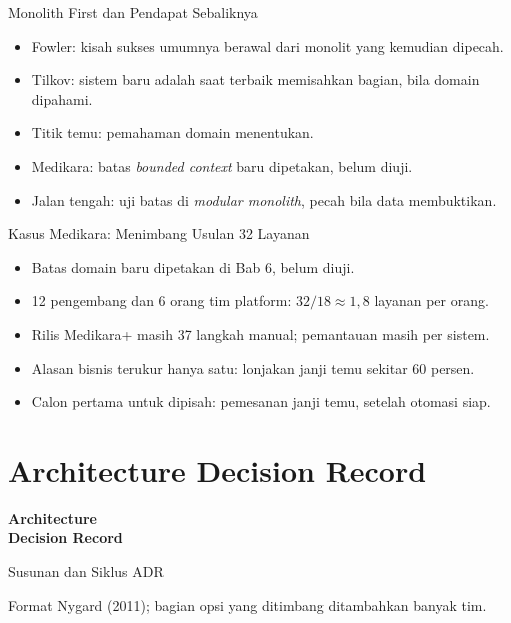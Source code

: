 \documentclass[aspectratio=169, table, 12pt]{beamer}
\begin{document}
\begin{frame}{{\Large Monolith First dan Pendapat Sebaliknya}}
  \vspace{10pt}
  \begin{itemize}
    \item Fowler: kisah sukses umumnya berawal dari monolit yang kemudian dipecah.
    \item Tilkov: sistem baru adalah saat terbaik memisahkan bagian, bila domain dipahami.
    \item Titik temu: pemahaman domain menentukan.
    \item Medikara: batas \textit{bounded context} baru dipetakan, belum diuji.
    \item Jalan tengah: uji batas di \textit{modular monolith}, pecah bila data membuktikan.
  \end{itemize}
\end{frame}

\begin{frame}{{\Large Kasus Medikara: Menimbang Usulan 32 Layanan}}
  \vspace{10pt}
  \begin{itemize}
    \item Batas domain baru dipetakan di Bab 6, belum diuji.
    \item 12 pengembang dan 6 orang tim platform: $32/18 \approx 1{,}8$ layanan per orang.
    \item Rilis Medikara+ masih 37 langkah manual; pemantauan masih per sistem.
    \item Alasan bisnis terukur hanya satu: lonjakan janji temu sekitar 60 persen.
    \item Calon pertama untuk dipisah: pemesanan janji temu, setelah otomasi siap.
  \end{itemize}
\end{frame}

\section{Architecture Decision Record}

\begin{frame}{\hfill}
  \centering
  \Huge{\textbf{Architecture\\Decision Record}}
\end{frame}

\begin{frame}{{\Large Susunan dan Siklus ADR}}
  \centering

  \vspace{4pt}
  {\small Format Nygard (2011); bagian opsi yang ditimbang ditambahkan banyak tim.}
\end{frame}
\end{document}
